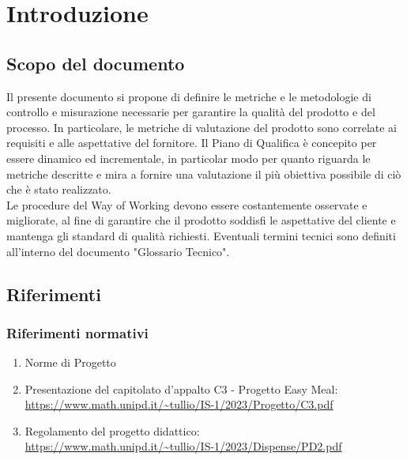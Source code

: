 \section{Introduzione}
\subsection{Scopo del documento}
Il presente documento si propone di definire le metriche e le metodologie di controllo e misurazione necessarie per garantire la qualità del prodotto e del processo. In particolare, le metriche di valutazione del prodotto sono correlate ai requisiti e alle aspettative del fornitore.
Il Piano di Qualifica è concepito per essere dinamico ed incrementale, in particolar modo per quanto riguarda le metriche descritte e mira a fornire una valutazione il più obiettiva possibile di ciò che è stato realizzato.\\
Le procedure del Way of Working devono essere costantemente osservate e migliorate, al fine di garantire che il prodotto soddisfi le aspettative del cliente e mantenga gli standard di qualità richiesti. Eventuali termini tecnici sono definiti all'interno del documento "Glossario Tecnico".

\subsection{Riferimenti}
\subsubsection{Riferimenti normativi}
\begin{enumerate}
    \item Norme di Progetto
    \item Presentazione del capitolato d'appalto C3 - Progetto Easy Meal: \\ 
    \url{https://www.math.unipd.it/~tullio/IS-1/2023/Progetto/C3.pdf}
    \item Regolamento del progetto didattico: \\ 
    \url{https://www.math.unipd.it/~tullio/IS-1/2023/Dispense/PD2.pdf}
\end{enumerate}

